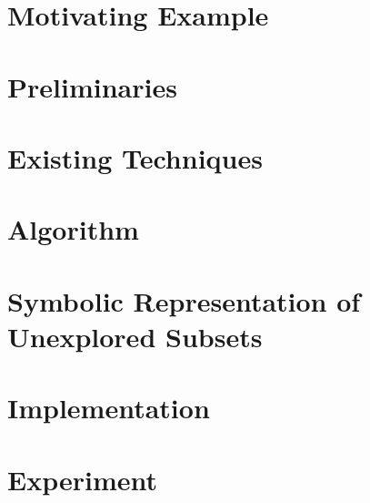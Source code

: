 \documentclass{llncs}
\begin{document}
\section{Motivating Example}
\label{sec:mot-example}



\section{Preliminaries}
\label{sec:preliminaries}



\section{Existing Techniques}
\label{sec:existing-techniques}



\section{Algorithm}
\label{sec:algorithm}


\section{Symbolic Representation of Unexplored Subsets}
\label{sec:symbolic-representation}



\section{Implementation}
\label{sec:impl}



\section{Experiment}
\label{sec:experiment}

\end{document}
